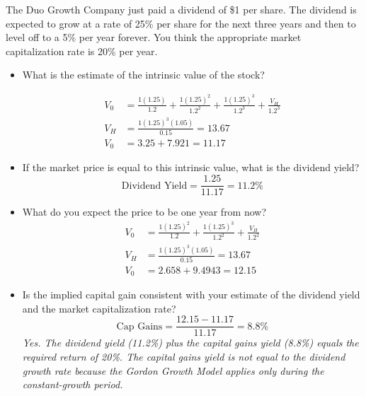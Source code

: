 \documentclass[11pt]{article}
\theoremstyle{definition}
\begin{document}
\begin{shaded}

        The Duo Growth Company just paid a dividend of \$1 per share.  The dividend is expected to grow at a rate of 25\% per share for the next three years and then to level off to a 5\% per year forever.   You think the appropriate market capitalization rate is 20\% per year.   
        \begin{itemize}
            \item What is the estimate of the intrinsic value of the stock?

            \begin{align*}
                V_0 &= \frac{1(1.25)}{1.2} + \frac{1(1.25)^2}{1.2^2} + \frac{1(1.25)^3}{1.2^3} 
                +\frac{V_H}{1.2^3}\\
                V_H &=  \frac{1(1.25)^3(1.05)}{0.15} = 13.67\\
                V_0 &= 3.25 + 7.921 = 11.17
            \end{align*}
                    
            \item If the market price is equal to this intrinsic value, what is the dividend 
            yield?
            $$\text{Dividend Yield} = \frac{1.25}{11.17} = 11.2\%$$
            \item What do you expect the price to be one year from now?
             \begin{align*}
                V_0 &= \frac{1(1.25)^2}{1.2} + \frac{1(1.25)^3}{1.2^2} 
                +\frac{V_H}{1.2^2}\\
                V_H &=  \frac{1(1.25)^3(1.05)}{0.15} = 13.67\\
                V_0 &= 2.658+ 9.4943 = 12.15
            \end{align*}
            \item Is the implied capital gain consistent with your estimate of the dividend 
            yield and the market capitalization rate?
            $$\text{Cap Gains} = \frac{12.15-11.17}{11.17} = 8.8\%$$
            \textit{Yes. The dividend yield (11.2\%) plus the capital gains yield (8.8\%) equals the required return of 20\%. The capital gains yield is not equal to the dividend growth rate because the Gordon Growth Model applies only during the constant-growth period.}

        \end{itemize}




            
\end{shaded}
\end{document}
